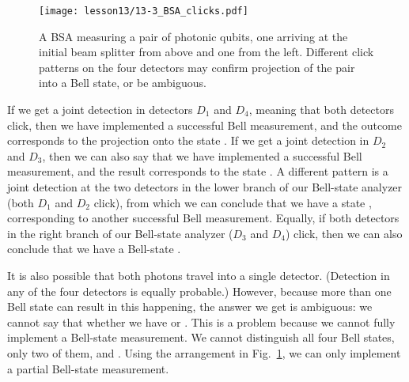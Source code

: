 \begin{figure}[t]
    \centering
    \texttt{[image: lesson13/13-3\_BSA\_clicks.pdf]}
    \caption[A four-detector Bell-state analyzer (BSA).]{A BSA measuring a pair of photonic qubits, one arriving at the initial beam splitter from above and one from the left.  Different click patterns on the four detectors may confirm projection of the pair into a Bell state, or be ambiguous.}
    \label{fig:13-BSA-clicks}
\end{figure}

If we get a joint detection in detectors $D_1$ and $D_4$, meaning that both detectors click, then we have implemented a successful Bell measurement, and the outcome corresponds to the projection onto the state \ket{\Psi^-}.
If we get a joint detection in $D_2$ and $D_3$, then we can also say that we have implemented a successful Bell measurement, and the result corresponds to the state \ket{\Psi^-}.
A different pattern is a joint detection at the two detectors in the lower branch of our Bell-state analyzer (both $D_1$ and $D_2$ click), from which we can conclude that we have a state \ket{\Psi^+}, corresponding to another successful Bell measurement.
Equally, if both detectors in the right branch of our Bell-state analyzer ($D_3$ and $D_4$) click, then we can also conclude that we have a Bell-state \ket{\Psi^+}.

It is also possible that both photons travel into a single detector. (Detection in any of the four detectors is equally probable.) However, because more than one Bell state can result in this happening, the answer we get is ambiguous: we cannot say that whether we have \ket{\Phi^+} or \ket{\Phi^-}.
This is a problem because we cannot fully implement a Bell-state measurement.
We cannot distinguish all four Bell states, only two of them, \ket{\Psi^+} and \ket{\Psi^-}.
Using the arrangement in Fig.~\ref{fig:13-BSA-clicks}, we can only implement a partial Bell-state measurement.

